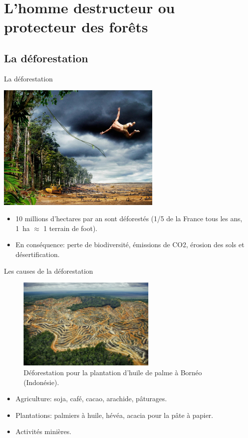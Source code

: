 \documentclass[10pt,table,dvipsnames,compress]{beamer}
\begin{document}
\section{L'homme destructeur ou protecteur des forêts}
\label{sec:org46d7217}

\subsection{La déforestation}
\label{sec:orgb42c0fa}

\begin{frame}[label={sec:orga2e073e}]{La déforestation}
\begin{center}
\includegraphics[width=0.6\textwidth]{figs/tarzan.jpg}
\end{center}

\begin{itemize}
\item 10 millions d'hectares par an sont déforestés (1/5 de la France tous les ans, 1 ha \(\approx\) 1 terrain de foot).
\item En conséquence: perte de biodiversité, émissions de CO2, érosion des sols et désertification.
\end{itemize}
\end{frame}
\begin{frame}[label={sec:org8045215}]{Les causes de la déforestation}
\begin{figure}[htbp]
\centering
\includegraphics[width=0.6\textwidth]{figs/plantations-huile-de-palme.jpg}
\caption{Déforestation pour la plantation d'huile de palme à Bornéo (Indonésie).}
\end{figure}

\begin{itemize}
\item Agriculture: soja, café, cacao, arachide, pâturages.
\item Plantations: palmiers à huile, hévéa, acacia pour la pâte à papier.
\item Activités minières.
\end{itemize}
\end{frame}
\end{document}
